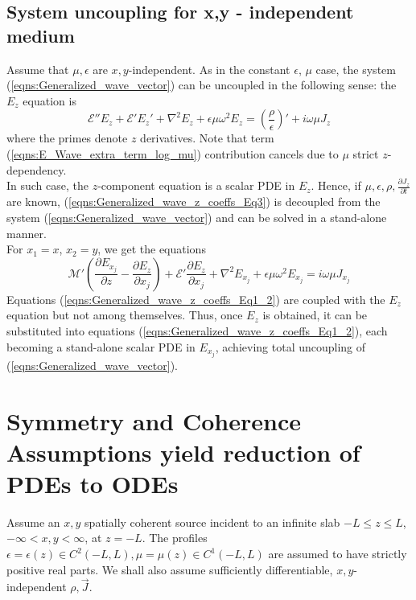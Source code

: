 \documentclass[twocolumn,secnumarabic,amssymb, nobibnotes, aps, prd]{revtex4-1}
\begin{document}
\subsection{System uncoupling for x,y - independent medium}
Assume that $\mu, \epsilon$ are $x,y$-independent. As in the constant $\epsilon$, $\mu$ case, the system (\ref{eqns:Generalized_wave_vector}) can be uncoupled in the following sense: the $E_z$  equation is
\begin{equation}
\mathcal{E}''{E_z} +\mathcal{E}' E_z' + \nabla^2 {E_z} +\epsilon  \mu \omega^2 E_z = \left( \frac{\rho}{\epsilon}\right)' + i \omega \mu J_z
\label{eqns:Generalized_wave_z_coeffs_Eq3}
\end{equation}
where the primes denote $z$ derivatives. Note that term (\ref{eqns:E_Wave_extra_term_log_mu}) contribution cancels due to $\mu$ strict $z$-dependency. \\ In such case, the $z$-component equation is a scalar PDE in $E_z$. Hence, if $\mu, \epsilon,\rho,\frac{\partial J_z}{\partial t}$ are known, (\ref{eqns:Generalized_wave_z_coeffs_Eq3}) is decoupled from the system (\ref{eqns:Generalized_wave_vector}) and can be solved in a stand-alone manner.\\ 
For $x_1=x$, $x_2=y$, we get the  equations  
\begin{equation}
\mathcal{M}'\left( \frac{\partial E_{x_j}}{\partial z} - \frac{\partial E_z}{\partial {x_j}}\right)+\mathcal{E}'\frac{\partial E_z}{\partial {x_j}}+\nabla^2 E_{x_j} +\epsilon \mu \omega^2 E_{x_j} = i \omega \mu J_{x_j}
\label{eqns:Generalized_wave_z_coeffs_Eq1_2}
\end{equation}
Equations (\ref{eqns:Generalized_wave_z_coeffs_Eq1_2}) are coupled with the $E_z$ equation but not among themselves. Thus, once $E_z$ is obtained, it can be substituted into equations  (\ref{eqns:Generalized_wave_z_coeffs_Eq1_2}), each becoming a stand-alone scalar PDE in $E_{x_j}$, achieving total uncoupling of (\ref{eqns:Generalized_wave_vector}).

\section{Symmetry and Coherence Assumptions yield reduction of PDEs to ODEs}

Assume an $x,y$ spatially coherent source incident to an infinite slab $-L \leq z \leq L$, $-\infty <x,y<\infty$, at $z=-L$. The profiles $\epsilon = \epsilon(z) \in C^{2}(-L,L), \mu=\mu(z)\in C^1(-L,L)$ are assumed to have strictly positive real parts. We shall also assume sufficiently differentiable, $x,y$-independent $\rho, \overrightarrow{J}$.\\
\end{document}
